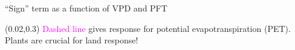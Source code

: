 \documentclass[aspectratio=169]{beamer}
\begin{document}
\begin{frame}{``Sign'' term as a function of VPD and PFT}
  \begin{figure}
  \end{figure}
  \begin{textblock*}{0.25\textwidth}(0.02\textwidth,0.3\textheight)
    \textcolor{magenta}{Dashed line} gives response for potential evapotranspiration (PET).\\
    \medskip
    Plants are crucial for land response!
  \end{textblock*}
\end{frame}
\end{document}
